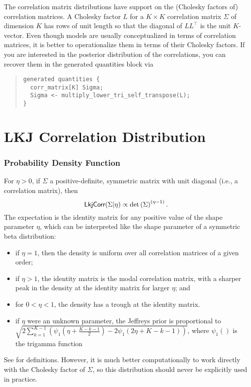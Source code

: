 \noindent
The correlation matrix distributions have support on the (Cholesky
factors of) correlation matrices.  A Cholesky factor $L$ for a $K
\times K$ correlation matrix $\Sigma$ of dimension $K$ has rows of unit
length so that the diagonal of $L L^{\top}$ is the unit $K$-vector. Even
though models are usually conceptualized in terms of correlation matrices,
it is better to operationalize them in terms of their Cholesky factors.
If you are interested in the posterior distribution of the correlations,
you can recover them in the generated quantities block via
%
\begin{quote}
\begin{Verbatim}
generated quantities {
  corr_matrix[K] Sigma;
  Sigma <- multiply_lower_tri_self_transpose(L);
}
\end{Verbatim}
\end{quote}
%
\section{LKJ Correlation Distribution}\label{lkj-correlation.section}

\subsubsection{Probability Density Function}

For $\eta > 0$, if $\Sigma$ a positive-definite, symmetric matrix with
unit diagonal (i.e., a correlation matrix), then
%
\[
\distro{LkjCorr}(\Sigma|\eta)
\propto \det \left( \Sigma \right)^{(\eta - 1)}.
\]
%
The expectation is the identity matrix for any positive value of the 
shape parameter $\eta$, which can be interpreted like the shape parameter
of a symmetric beta distribution:
\begin{itemize}
\item if $\eta = 1$, then the density is uniform over all correlation
  matrices of a given order;
\item if $\eta > 1$, the identity matrix is the modal correlation
  matrix, with a sharper peak in the density at the identity matrix
  for larger $\eta$; and
\item for $0 < \eta < 1$, the density has a trough at the identity
  matrix.
\item if $\eta$ were an unknown parameter, the Jeffreys prior is
  proportional to $\sqrt{2\sum_{k=1}^{K-1}\left(
  \psi_1\left(\eta+\frac{K-k-1}{2}\right) - 
  2\psi_1\left(2\eta+K-k-1 \right)\right)}$, where $\psi_1()$ is the
  trigamma function
\end{itemize}
See \citep{LewandowskiKurowickaJoe:2009} for definitions. However, it
is much better computationally to work directly with the Cholesky factor
of $\Sigma$, so this distribution should never be explicitly used in 
practice.

